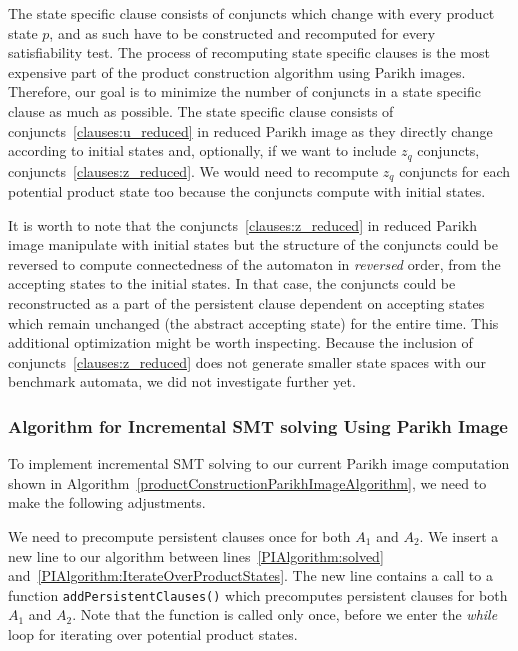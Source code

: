 The state specific clause consists of conjuncts which change with every product state $p$, and as such have to be constructed and recomputed for every satisfiability test. The process of recomputing state specific clauses is the most expensive part of the product construction algorithm using Parikh images. Therefore, our goal is to minimize the number of conjuncts in a state specific clause as much as possible. The state specific clause consists of conjuncts~\ref{clauses:u_reduced} in reduced Parikh image as they directly change according to initial states and, optionally, if we want to include $z_{q}$ conjuncts, conjuncts~\ref{clauses:z_reduced}. We would need to recompute $z_{q}$ conjuncts for each potential product state too because the conjuncts compute with initial states.

It is worth to note that the conjuncts~\ref{clauses:z_reduced} in reduced Parikh image manipulate with initial states but the structure of the conjuncts could be reversed to compute connectedness of the automaton in \emph{reversed} order, from the accepting states to the initial states. In that case, the conjuncts could be reconstructed as a part of the persistent clause dependent on accepting states which remain unchanged (the abstract accepting state) for the entire time. This additional optimization might be worth inspecting. Because the inclusion of conjuncts~\ref{clauses:z_reduced} does not generate smaller state spaces with our benchmark automata, we did not investigate further yet.

\subsubsection{Algorithm for Incremental SMT solving Using Parikh Image}


To implement incremental SMT solving to our current Parikh image computation shown in Algorithm~\ref{productConstructionParikhImageAlgorithm}, we need to make the following adjustments.

We need to precompute persistent clauses once for both $A_1$ and $A_2$. We insert a new line to our algorithm between lines~\ref{PIAlgorithm:solved} and~\ref{PIAlgorithm:IterateOverProductStates}. The new line contains a call to a function \texttt{addPersistentClauses()} which precomputes persistent clauses for both $A_1$ and $A_2$. Note that the function is called only once, before we enter the \emph{while} loop for iterating over potential product states.

